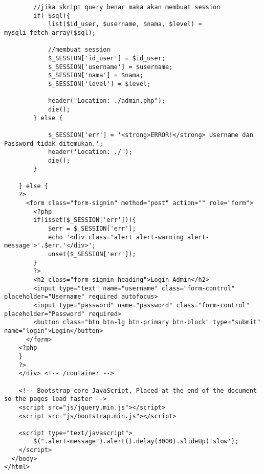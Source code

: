 \begin{lstlisting}
        //jika skript query benar maka akan membuat session
		if( $sql){
			list($id_user, $username, $nama, $level) = mysqli_fetch_array($sql);

            //membuat session
            $_SESSION['id_user'] = $id_user;
			$_SESSION['username'] = $username;
			$_SESSION['nama'] = $nama;
			$_SESSION['level'] = $level;

			header("Location: ./admin.php");
			die();
		} else {

			$_SESSION['err'] = '<strong>ERROR!</strong> Username dan Password tidak ditemukan.';
			header('Location: ./');
			die();
		}

	} else {
	?>
      <form class="form-signin" method="post" action="" role="form">
		<?php
		if(isset($_SESSION['err'])){
			$err = $_SESSION['err'];
			echo '<div class="alert alert-warning alert-message">'.$err.'</div>';
            unset($_SESSION['err']);
		}
		?>
        <h2 class="form-signin-heading">Login Admin</h2>
        <input type="text" name="username" class="form-control" placeholder="Username" required autofocus>
        <input type="password" name="password" class="form-control" placeholder="Password" required>
        <button class="btn btn-lg btn-primary btn-block" type="submit" name="login">Login</button>
      </form>
	<?php
	}
	?>
    </div> <!-- /container -->

	<!-- Bootstrap core JavaScript, Placed at the end of the document so the pages load faster -->
    <script src="js/jquery.min.js"></script>
    <script src="js/bootstrap.min.js"></script>

	<script type="text/javascript">
		$(".alert-message").alert().delay(3000).slideUp('slow');
	</script>
  </body>
</html>

\end{lstlisting}

